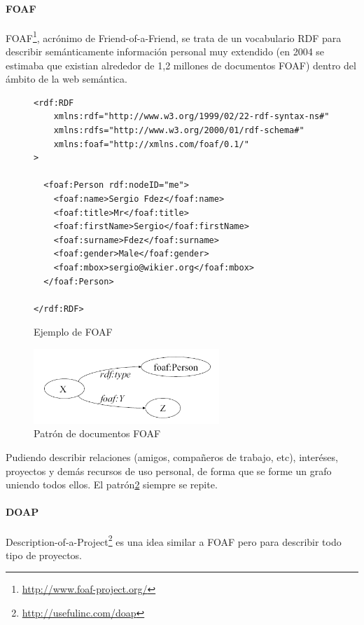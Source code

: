 \paragraph{FOAF}

FOAF\footnote{\url{http://www.foaf-project.org/}}, acrónimo de Friend-of-a-Friend, 
se trata de un vocabulario RDF para describir semánticamente información personal
muy extendido (en 2004 se estimaba\cite{Li2005} que existian alrededor de 1,2 millones 
de documentos FOAF) dentro del ámbito de la web semántica.

\begin{figure} [H]
\lstset{language=XML}
\begin{lstlisting}
<rdf:RDF
	xmlns:rdf="http://www.w3.org/1999/02/22-rdf-syntax-ns#"
	xmlns:rdfs="http://www.w3.org/2000/01/rdf-schema#"
	xmlns:foaf="http://xmlns.com/foaf/0.1/"
>

  <foaf:Person rdf:nodeID="me">
    <foaf:name>Sergio Fdez</foaf:name>
    <foaf:title>Mr</foaf:title>
    <foaf:firstName>Sergio</foaf:firstName>
    <foaf:surname>Fdez</foaf:surname>
    <foaf:gender>Male</foaf:gender>
    <foaf:mbox>sergio@wikier.org</foaf:mbox>
  </foaf:Person>

</rdf:RDF>
\end{lstlisting}
\caption{Ejemplo de FOAF}
\label{fig:ejemplo.foaf}
\end{figure}

\begin{figure}[tp]
 	\centering
	\includegraphics[width=7cm]{images/patron-foaf.png}
	\caption{Patrón de documentos FOAF}
	\label{fig:patternFOAF}
\end{figure}

Pudiendo describir relaciones (amigos, compañeros de trabajo, etc), interéses,
proyectos y demás recursos de uso personal, de forma que se forme un grafo 
uniendo todos ellos. El patrón\ref{fig:patternFOAF} siempre se repite.

\paragraph{DOAP}

Description-of-a-Project\footnote{\url{http://usefulinc.com/doap}} es una idea 
similar a FOAF pero para describir todo tipo de proyectos.

